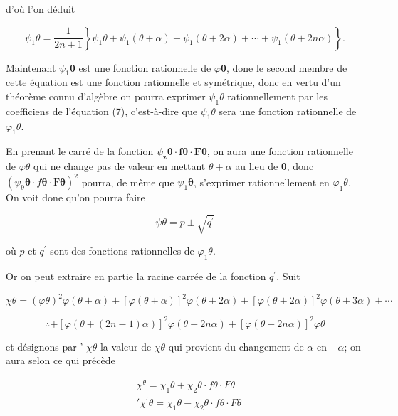 \documentclass{article}
\begin{document}
d'où l'on déduit

\[
\left.\left.\psi_{1} \theta=\frac{1}{2 n+1}\right\} \psi_{1} \theta+\psi_{1}(\theta+\alpha)+\psi_{1}(\theta+2 \alpha)+\cdots+\psi_{1}(\theta+2 n \alpha)\right\} .
\]

Maintenant \(\psi_{1} \boldsymbol{\theta}\) est une fonction rationnelle de \(\varphi \boldsymbol{\theta}\), done le second membre de cette équation est une fonction rationnelle et symétrique, donc en vertu d'un théorème connu d'algèbre on pourra exprimer \(\psi_{1} \theta\) rationnellement par les coefficiens de l'équation (7), c'est-à-dire que \(\psi_{1} \theta\) sera une fonction rationnelle de \(\varphi_{1} \theta\).

En prenant le carré de la fonction \(\psi_{\mathbf{z}} \boldsymbol{\theta} \cdot \boldsymbol{f} \boldsymbol{\theta} \cdot \boldsymbol{F} \boldsymbol{\theta}\), on aura une fonction
rationnelle de \(\varphi \theta\) qui ne change pas de valeur en mettant \(\theta+\alpha\) au lieu de \(\boldsymbol{\theta}\), donc \(\left(\psi_{9} \boldsymbol{\theta} \cdot f \boldsymbol{\theta} \cdot \mathrm{F} \boldsymbol{\theta}\right)^{2}\) pourra, de même que \(\psi_{1} \boldsymbol{\theta}\), s'exprimer rationnellement en \(\varphi_{1} \theta\). On voit done qu'on pourra faire

\[
\psi \theta=p \pm \sqrt{q^{\prime}}
\]

où \(p\) et \(q^{\prime}\) sont des fonctions rationnelles de \(\varphi_{1} \theta\).

Or on peut extraire en partie la racine carrée de la fonction \(q^{\prime}\). Suit

\[
\chi \theta=(\varphi \theta)^{2} \varphi(\theta+\alpha)+[\varphi(\theta+\alpha)]^{2} \varphi(\theta+2 \alpha)+[\varphi(\theta+2 \alpha)]^{2} \varphi(\theta+3 \alpha)+\cdots
\]

\[
\therefore+[\varphi(\theta+(2 n-1) \alpha)]^{2} \varphi(\theta+2 n \alpha)+[\varphi(\theta+2 n \alpha)]^{2} \varphi \theta
\]

et désignons par ' \(\chi \theta\) la valeur de \(\chi \theta\) qui provient du changement de \(\alpha\) en \(-\alpha\); on aura selon ce qui précède

\[
\begin{aligned}
& \chi^{\theta}=\chi_{1} \theta+\chi_{2} \theta \cdot f \theta \cdot F \theta \\
& ' \chi^{\prime} \theta=\chi_{1} \theta-\chi_{2} \theta \cdot f \theta \cdot F \theta
\end{aligned}
\]
\end{document}
